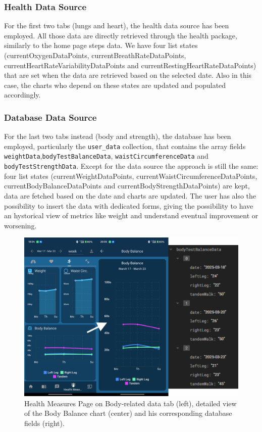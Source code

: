 \subsubsection{Health Data Source}
For the first two tabs (lungs and heart), the health data source has been employed. All those data are directly retrieved through the health package, similarly to the home page steps data. We have four list states (currentOxygenDataPoints, currentBreathRateDataPoints, currentHeartRateVariabilityDataPoints and currentRestingHeartRateDataPoints) that are set when the data are retrieved based on the selected date. Also in this case, the charts who depend on these states are updated and populated accordingly.

\subsubsection{Database Data Source}
For the last two tabs instead (body and strength), the database has been employed, particularly the \texttt{user\_data} collection, that contains the array fields \texttt{weightData},\newline\texttt{bodyTestBalanceData}, \texttt{waistCircumferenceData} and \texttt{bodyTestStrengthData}. Except for the data source the approach is still the same: four list states (currentWeightDataPoints, currentWaistCircumferenceDataPoints, currentBodyBalanceDataPoints and currentBodyStrengthDataPoints) are kept, data are fetched based on the date and charts are updated. The user has also the possibility to insert the data with dedicated forms, giving the possibility to have an hystorical view of metrics like weight and understand eventual improvement or worsening.

\begin{figure}
    \centering
    \includegraphics[width=1.0\linewidth]{./images/healthMeasures.jpg}
    \caption{Health Measures Page on Body-related data tab (left), detailed view of the Body Balance chart (center) and his corresponding database fields (right).}
\end{figure}

